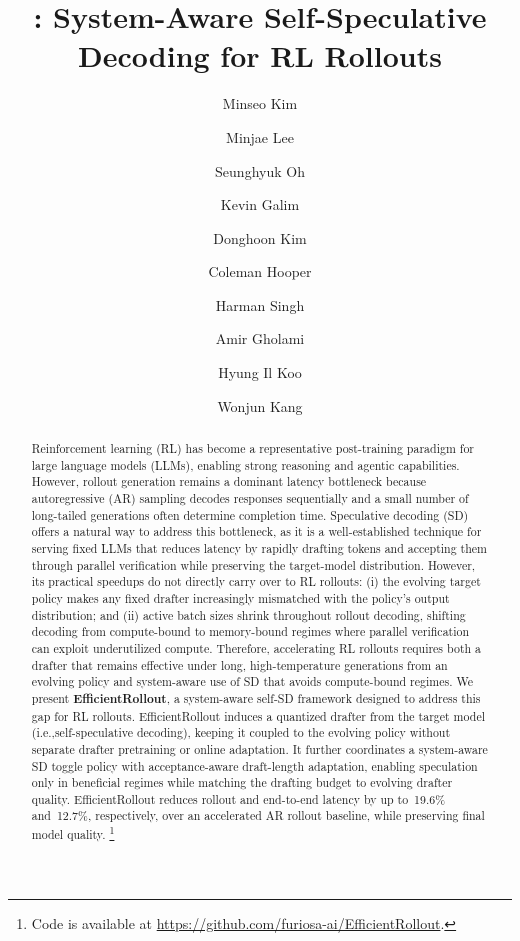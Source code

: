 \documentclass{llmxive}
\title{\methodtitle{}: System-Aware Self-Speculative Decoding for RL Rollouts}
\author{Minseo Kim \and Minjae Lee \and Seunghyuk Oh \and Kevin Galim \and Donghoon Kim \and Coleman Hooper \and Harman Singh \and Amir Gholami \and Hyung Il Koo \and Wonjun Kang}
\providecommand{\ie}{i.e.,\xspace}
\providecommand{\methodtitle}{EfficientRollout}
\providecommand{\speedupete}{12.7\%}
\providecommand{\speeduprollout}{19.6\%}
\providecommand{\bottleneck}{latency bottleneck}
\providecommand{\mj}[1]{}
\begin{document}
\maketitle
\begin{abstract}
Reinforcement learning (RL) has become a representative post-training paradigm for large language models (LLMs), enabling strong reasoning and agentic capabilities.
However, rollout generation remains a dominant \bottleneck{} because autoregressive (AR) sampling decodes responses sequentially and a small number of long-tailed generations often determine completion time.
Speculative decoding (SD) offers a natural way to address this bottleneck, as it is a well-established technique for serving fixed LLMs that reduces latency by rapidly drafting tokens and accepting them through parallel verification while preserving the target-model distribution.
However, its practical speedups do not directly carry over to RL rollouts: (i) the evolving target policy makes any fixed drafter increasingly mismatched with the policy's output distribution; and (ii) active batch sizes shrink throughout rollout decoding, shifting decoding from compute-bound to memory-bound regimes where parallel verification can exploit underutilized compute.
Therefore, accelerating RL rollouts requires both a drafter that remains effective under long, high-temperature generations from an evolving policy and system-aware use of SD that avoids compute-bound regimes.
We present \textbf{\methodtitle{}}, a system-aware self-SD framework designed to address this gap for RL rollouts.
\methodtitle{} induces a quantized drafter from the target model (\ie{}self-speculative decoding), keeping it coupled to the evolving policy without separate drafter pretraining or online adaptation.
It further coordinates a system-aware SD toggle policy with acceptance-aware draft-length adaptation, enabling speculation only in beneficial regimes while matching the drafting budget to evolving drafter quality.
\methodtitle{} reduces rollout and end-to-end latency by up to~\speeduprollout{} and~\speedupete{}, respectively, over an accelerated AR rollout baseline, while preserving final model quality.
\footnote{Code is available at \url{https://github.com/furiosa-ai/EfficientRollout}.}
\end{abstract}
\setcounter{footnote}{0}
\end{document}
